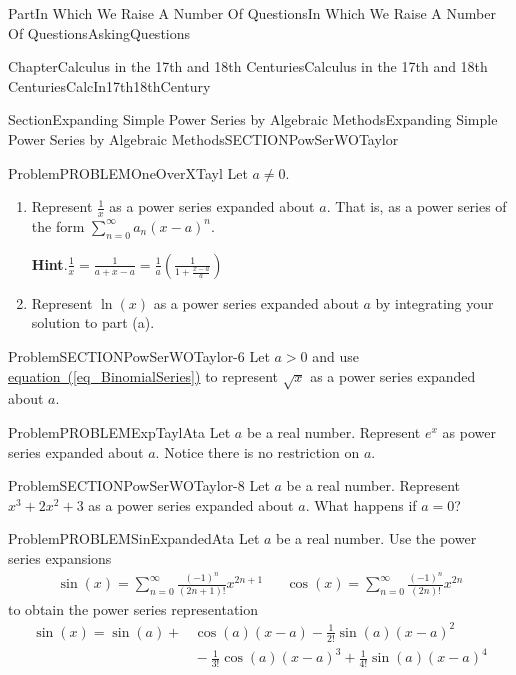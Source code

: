 \documentclass[oneside,10pt,]{book}
\newcommand{\blocktitlefont}{\relax}
\newcommand{\xreffont}{\relax}
\numberwithin{equation}{part}
\newcommand{\amp}{&}
\begin{document}
\begin{partptx}{Part}{In Which We Raise A Number Of Questions}{}{In Which We Raise A Number Of Questions}{}{}{AskingQuestions}
\begin{chapterptx}{Chapter}{Calculus in the 17th and 18th Centuries}{}{Calculus in the 17th and 18th Centuries}{}{}{CalcIn17th18thCentury}
\begin{sectionptx}{Section}{Expanding Simple Power Series by Algebraic Methods}{}{Expanding Simple Power Series by Algebraic Methods}{}{}{SECTIONPowSerWOTaylor}
\begin{problem}{Problem}{}{PROBLEMOneOverXTayl}%
Let \(a\neq 0\).%
\begin{enumerate}[font=\bfseries,label=(\alph*),ref=\alph*]%
\item{}Represent \(\frac{1}{x}\) as a power series expanded about \(a\).  That is, as a power series of the form \(\sum^{\infty }_{n=0}{a_n{(x-a)}^n}\).%
\par\smallskip%
\noindent\textbf{\blocktitlefont Hint}.\hypertarget{PROBLEMOneOverXTayl-2-2}{}\quad{}\(\frac{1}{x}=\frac{1}{a+x-a}=\frac{1}{a}\left(\frac{1}{1+\frac{x-a}{a}}\right)\)%
\item{}Represent \(\ln (x)\) as a power series expanded about \(a\) by integrating your solution to part (a).%
\end{enumerate}%
\end{problem}
\begin{problem}{Problem}{}{SECTIONPowSerWOTaylor-6}%
Let \(a>0\) and use \hyperref[eq_BinomialSeries]{equation~({\xreffont\ref{eq_BinomialSeries}})} to represent \(\sqrt{x}\) as a power series expanded about \(a\).%
\end{problem}
\begin{problem}{Problem}{}{PROBLEMExpTaylAta}%
Let \(a\) be a real number.  Represent \(e^x\) as power series expanded about \(a\).  Notice there is no restriction on \(a\).%
\end{problem}
\begin{problem}{Problem}{}{SECTIONPowSerWOTaylor-8}%
Let \(a\) be a real number.  Represent \(x^3+2x^2+3\) as a power series expanded about \(a\).  What happens if \(a=0\)?%
\end{problem}
\begin{problem}{Problem}{}{PROBLEMSinExpandedAta}%
Let \(a\) be a real number.  Use the power series expansions%
\begin{align*}
\sin \left(x\right)=\sum^{\infty
}_{n=0}{\frac{{\left(-1\right)}^n}{\left(2n+1\right)!}x^{2n+1}}\amp{}\amp{} \cos\left(x\right)=\sum^{\infty
}_{n=0}{\frac{{\left(-1\right)}^n}{\left(2n\right)!}x^{2n}}
\end{align*}
to obtain the power series representation%
\begin{align*}
\sin (x)=\sin (a)+\amp{}\cos \left(a\right)\left(x-a\right)-\frac{1}{2!}\sin
\left(a\right){\left(x-a\right)}^2\\
\amp{}-\frac{1}{3!}\cos
\left(a\right){\left(x-a\right)}^3+\frac{1}{4!}\sin
\left(a\right){\left(x-a\right)}^4\\

\end{align*}
\end{problem}
\end{sectionptx}
\end{chapterptx}
\end{partptx}
\end{document}
